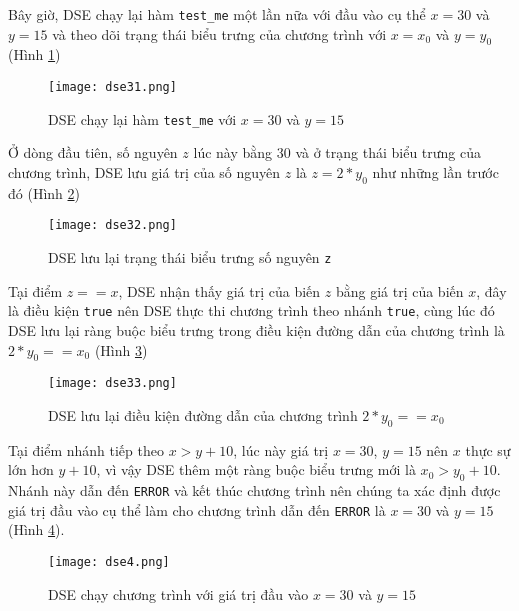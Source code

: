 Bây giờ, DSE chạy lại hàm \texttt{test\_me} một lần nữa với đầu vào cụ thể $ x = 30 $ 
và $ y = 15 $ và theo dõi trạng thái biểu trưng của chương trình với $x = x_{0}$ 
và $y = y_{0}$ (Hình \ref{fig:dse31})

\begin{figure}[H]	
	\begin{center}
		\texttt{[image: dse31.png]}
	\end{center}
	\caption{DSE chạy lại hàm \texttt{test\_me} với $ x = 30 $ và $ y = 15 $}
	\label{fig:dse31}
\end{figure}


Ở dòng đầu tiên, số nguyên $ z $ lúc này bằng $ 30 $ và ở trạng thái biểu trưng 
của chương trình, DSE lưu giá trị của số nguyên $ z $ là $ z = 2*y_{0} $ 
như những lần trước đó (Hình \ref{fig:dse32})

\begin{figure}[H]	
	\begin{center}
		\texttt{[image: dse32.png]}
	\end{center}
	\caption{DSE lưu lại trạng thái biểu trưng số nguyên \texttt{z}}
	\label{fig:dse32}
\end{figure}

Tại điểm $ z == x $, DSE nhận thấy giá trị của biến $ z $ bằng giá trị của 
biến $ x $, đây là điều kiện \texttt{true} nên DSE thực thi chương trình 
theo nhánh \texttt{true}, cùng lúc đó DSE lưu lại ràng buộc biểu trưng trong 
điều kiện đường dẫn của chương trình là $ 2*y_{0} == x_{0} $ (Hình \ref{fig:dse33})

\begin{figure}[H]	
	\begin{center}
		\texttt{[image: dse33.png]}
	\end{center}
	\caption{DSE lưu lại điều kiện đường dẫn của chương trình $ 2*y_{0} == x_{0} $}
	\label{fig:dse33}
\end{figure}

Tại điểm nhánh tiếp theo $ x > y+10 $, lúc này giá trị $ x = 30 $, $ y = 15 $ 
nên $ x $ thực sự lớn hơn $ y+10 $, vì vậy DSE thêm một ràng buộc biểu trưng 
mới là $ x_{0} > y_{0}+ 10 $. Nhánh này dẫn đến \texttt{ERROR} và kết thúc chương 
trình nên chúng ta xác định được giá trị đầu vào cụ thể làm cho chương trình 
dẫn đến \texttt{ERROR} là $ x = 30 $ và $ y = 15 $ (Hình \ref{fig:dse4}).

\begin{figure}[H]
	\begin{center}
		\texttt{[image: dse4.png]}
	\end{center}	
	\caption{DSE chạy chương trình với giá trị đầu vào $x = 30$ và $y = 15$}
\label{fig:dse4}
\end{figure}


